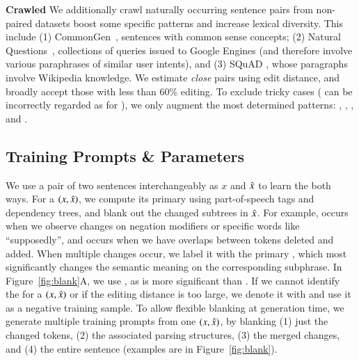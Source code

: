 \textbf{Crawled} 
We additionally crawl naturally occurring sentence pairs from non-paired datasets boost some specific patterns and increase lexical diversity. 
This include 
(1) CommonGen~\cite{lin-etal-2020-commongen}, sentences with common sense concepts; 
(2) Natural Questions~\cite{kwiatkowski-etal-2019-natural}, collections of queries issued to Google Engines (and therefore involve various paraphrases of similar user intents), and 
(3) SQuAD \cite{rajpurkar-etal-2016-squad}, whose paragraphs involve Wikipedia knowledge.
We estimate \emph{close} pairs using edit distance, and broadly accept those with less than 60\% editing.
To exclude tricky cases (\eg {} can be incorrectly regarded as  for ), we only augment the most determined patterns: , , , and .


\subsection{Training Prompts \& Parameters}

We use a pair of two sentences interchangeably as $x$ and $\hat{x}$ to learn the \tagstrs both ways.
For a $(x, \hat{x})$, we compute its primary \tagstr using part-of-speech tags and dependency trees, and blank out the changed subtrees in $\hat{x}$.
For example,  occurs when we observe changes on negation modifiers or specific words like ``supposedly'', and  occurs when we have overlaps between tokens deleted and added.
When multiple changes occur, we label it with the primary \tagstr, which most significantly changes the semantic meaning on the corresponding subphrase.
In Figure~\ref{fig:blank}A, we use , as  is more significant than .
If we cannot identify the \tagstr for a $(x, \hat{x})$ or if the editing distance is too large, we denote it with  and use it as a negative training sample.
To allow flexible blanking at generation time, we generate multiple training prompts from one $(x, \hat{x})$, by blanking (1) just the changed tokens, (2) the associated parsing structures, (3) the merged changes, and (4) the entire sentence (examples are in Figure~\ref{fig:blank}).

